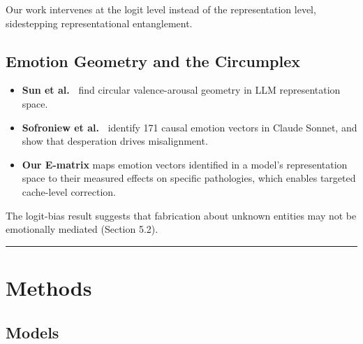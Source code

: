 \documentclass[11pt,letterpaper]{article}
\providecommand{\tightlist}{\setlength{\itemsep}{0pt}\setlength{\parskip}{0pt}}
\DeclareRobustCommand{\_}{\textunderscore\allowbreak}
\begin{document}
Our work intervenes at the logit level instead of the representation level, sidestepping representational entanglement.

\hypertarget{emotion-geometry-and-the-circumplex}{%
\subsection{Emotion Geometry and the Circumplex}\label{emotion-geometry-and-the-circumplex}}

\begin{itemize}
\tightlist
\item
  \textbf{Sun et al.~\cite{sun2026valence}} find circular valence-arousal geometry in LLM representation space.
\item
  \textbf{Sofroniew et al.~\cite{sofroniew2026emotion}} identify 171 causal emotion vectors in Claude Sonnet, and show that desperation drives misalignment.
\item
  \textbf{Our E-matrix} maps emotion vectors identified in a model's representation space to their measured effects on specific pathologies, which enables targeted cache-level correction.
\end{itemize}

The logit-bias result suggests that fabrication about unknown entities may not be emotionally mediated (Section 5.2).

\begin{center}\rule{0.5\linewidth}{0.5pt}\end{center}

\hypertarget{methods}{%
\section{Methods}\label{methods}}

\hypertarget{models}{%
\subsection{Models}\label{models}}
\end{document}
